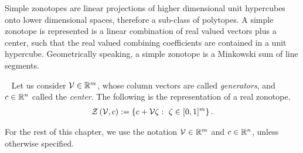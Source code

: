 Simple zonotopes are linear
projections of higher dimensional unit hypercubes onto lower
dimensional spaces, therefore a sub-class of polytopes.  A simple
zonotope is represented is a linear combination of real valued vectors
plus a center, such that the real valued combining coefficients are
contained in a unit hypercube.  Geometrically speaking, a simple
zonotope is a Minkowski sum of line segments.
%
\begin{definition}~\label{defn:rztope}
Let us consider $\mathcal{V}\in\mathbb{R}^m$, whose column vectors are called
\emph{generators}, and $c\in\mathbb{R}^n$ called the \emph{center}.  The following is the
representation of a real zonotope.
%
\begin{align*}
\mathit{\mathcal{Z}}\left(\mathcal{V},c\right):=\left\{c+\mathcal{V}\zeta:~\zeta\in[0,1]^m\right\}.
\end{align*}
%
\end{definition}
%
For the rest of this chapter, we
use the notation $\mathcal{V}\in\mathbb{R}^m$ and $c\in\mathbb{R}^n$, unless
otherwise specified.


